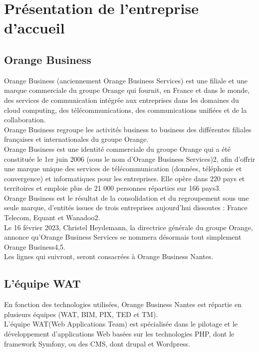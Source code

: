 \chapter{Présentation de l'entreprise d'accueil}
\section{Orange Business}
	Orange Business (anciennement Orange Business Services) est une filiale et une marque commerciale du groupe Orange qui fournit, en France et dans le monde, des services de communication intégrée aux entreprises dans les domaines du cloud computing, des télécommunications, des communications unifiées et de la collaboration.\\
	Orange Business regroupe les activités business to business des différentes filiales françaises et internationales du groupe Orange.\cite{orange_business}\\
	
	Orange Business est une identité commerciale du groupe Orange qui a été constituée le 1er juin 2006 (sous le nom d'Orange Business Services)2, afin d'offrir une marque unique des services de télécommunication (données, téléphonie et convergence) et informatiques pour les entreprises. Elle opère dans 220 pays et territoires et emploie plus de 21 000 personnes réparties sur 166 pays3.\\
	
	Orange Business est le résultat de la consolidation et du regroupement sous une seule marque, d’entités issues de trois entreprises aujourd’hui dissoutes : France Telecom, Equant et Wanadoo2.\\
	
	Le 16 février 2023, Christel Heydemann, la directrice générale du groupe Orange, annonce qu'Orange Business Services se nommera désormais tout simplement Orange Business4,5.\cite{orange_business}\\
	
	Les lignes qui suivront, seront consacrées à Orange Business Nantes.
	
\section{L'équipe WAT} %
	En fonction des technologies utilisées, Orange Business Nantes est répartie en plusieurs équipes (WAT, BIM, PIX, TED et TM).\\
	
	L'équipe WAT(Web Applications Team) est spécialisée dans le pilotage et le développement d'applications Web basées sur les technologies PHP, dont le framework Symfony, ou des CMS, dont drupal et Wordpress.\\
	
